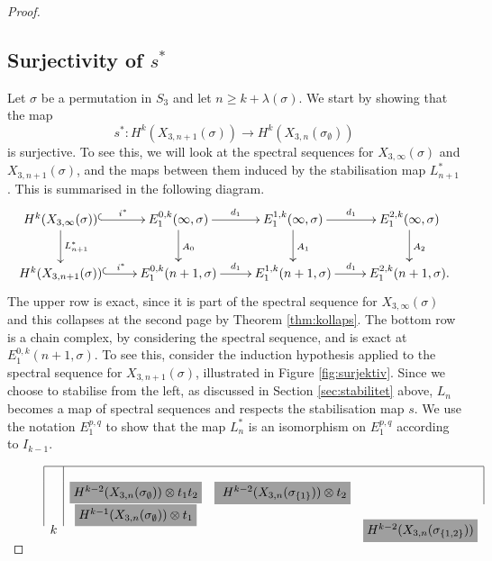 \begin{proof}
  
  
  \subsection{Surjectivity of $s^*$}
  
  Let $\sigma$ be a permutation in $S_3$ and let $n \geq k +
  \lambda(\sigma)$. We start by showing that the map
  \[ s^* : H^k(X_{3,n+1}(\sigma)) \to
  H^k(X_{3,n}(\sigma_{\emptyset})) \] 
  is surjective.
  To see this, we will look at the spectral sequences for
  $X_{3,\infty}(\sigma)$ and $X_{3,n+1}(\sigma)$, and the maps between
  them induced by the stabilisation map $L^*_{n+1}$. This is
  summarised in the following diagram.
  \[ \xymatrix{ H^k(X_{3,\infty}(\sigma))
    \ar@{^(->}[r]^-{i^*}\ar[d]^{L^*_{n+1}} & E_1^{0,k}(\infty,\sigma)
    \ar[r]^{d_1}\ar[d]^{A_0} & 
    E_1^{1,k}(\infty,\sigma) \ar[r]^{d_1}\ar[d]^{A_1} &
    E_1^{2,k}(\infty,\sigma) \ar[d]^{A_2} \\
     H^k(X_{3,n+1}(\sigma)) \ar@{^(->}[r]^-{i^*} &
    E_1^{0,k}(n+1,\sigma) \ar[r]^{d_1} & E_1^{1,k}(n+1,\sigma)
    \ar[r]^{d_1} & E_1^{2,k}(n+1,\sigma).
  } \]
  The upper row is exact, since it is part of the spectral sequence for
  $X_{3,\infty}(\sigma)$ and this collapses at the second page by
  Theorem \ref{thm:kollaps}. The
  bottom row is a chain complex, by considering the spectral sequence,
  and is exact at
  $E_1^{0,k}(n+1,\sigma)$. To see this, consider the induction
  hypothesis applied to the spectral sequence for $X_{3,n+1}(\sigma)$,
  illustrated in Figure \ref{fig:surjektiv}. Since we choose to
  stabilise from the left,
  as discussed in Section \ref{sec:stabilitet} above, $L_n$
  becomes a map of spectral sequences and respects the stabilisation map
  $s$. We use the notation \colorbox{isomorphism}{$E_1^{p,q}$} to show
  that the map $L_n^*$ is an isomorphism on $E_1^{p,q}$ according to
  $I_{k-1}$. 
  \begin{figure}[ht]
    \[ 
    \begin{array}{|c|ccc|}
      \hline 
      &
      &
      &
      \\
      \multirow{6}{*}{$k$} 
      & \colorbox{isomorphism}{$H^{k-2}(X_{3,n}(\sigma_{\emptyset}))
        \otimes t_1t_2 $}
      & \colorbox{isomorphism}{ $H^{k-2}(X_{3,n}(\sigma_{\set{1}}))
        \otimes t_2 $}
      & \multirow{6}{*}{\colorbox{isomorphism}{$
        H^{k-2}(X_{3,n}(\sigma_{\set{1,2}}))$}} \\
      & \colorbox{isomorphism}{$H^{k-1}(X_{3,n}(\sigma_{\emptyset}))
        \otimes t_1$}

\end{array}\]
\end{figure}
\end{proof}

